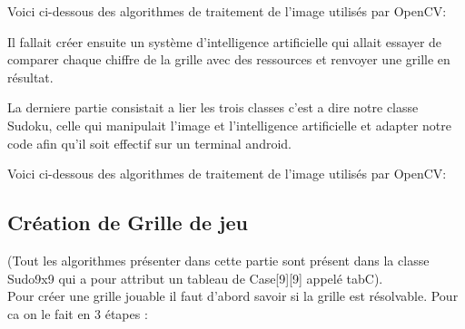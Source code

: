 \documentclass{article}
\begin{document}
Voici ci-dessous des algorithmes de traitement de l'image utilisés par OpenCV:

Il fallait créer ensuite un système d'intelligence artificielle qui  allait essayer de comparer chaque chiffre de la grille avec des ressources et renvoyer une grille en résultat.

La derniere partie consistait a lier les trois classes c'est a dire notre classe Sudoku, celle qui manipulait l'image et l'intelligence artificielle et adapter notre code afin qu'il soit effectif sur un terminal android.

Voici ci-dessous des algorithmes de traitement de l'image utilisés par OpenCV:


\subsection{Création de Grille de jeu}
(Tout les algorithmes présenter dans cette partie sont présent dans la classe Sudo9x9 qui a pour attribut un tableau de Case[9][9] appelé tabC).\\
Pour créer une grille jouable il faut d'abord savoir si la grille est résolvable. 
Pour ca on le fait en 3 étapes : 
\end{document}
